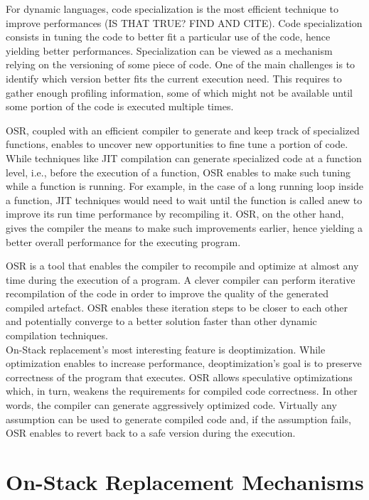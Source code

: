 For dynamic languages, code specialization is the most efficient technique to improve performances (IS THAT TRUE? FIND AND CITE).
Code specialization consists in tuning the code to better fit a particular use of the code, hence yielding better performances.
Specialization can be viewed as a mechanism relying on the versioning of some piece of code.
One of the main challenges is to identify which version better fits the current execution need.
This requires to gather enough profiling information, some of which might not be available until some portion of the code is executed multiple times.

OSR, coupled with an efficient compiler to generate and keep track of specialized functions, enables to uncover new opportunities to fine tune a portion of code.
While techniques like JIT compilation can generate specialized code at a function level, i.e., before the execution of a function, OSR enables to make such tuning while a function is running.
For example, in the case of a long running loop inside a function, JIT techniques would need to wait until the function is called anew to improve its run time performance by recompiling it. 
OSR, on the other hand, gives the compiler the means to make such improvements earlier, hence yielding a better overall performance for the executing program.

OSR is a tool that enables the compiler to recompile and optimize at almost any time during the execution of a program.
A clever compiler can perform iterative recompilation of the code in order to improve the quality of the generated compiled artefact.
OSR enables these iteration steps to be closer to each other and potentially converge to a better solution faster than other dynamic compilation techniques.\\

On-Stack replacement's most interesting feature is deoptimization. 
While optimization enables to increase performance, deoptimization's goal is to preserve correctness of the program that executes.
OSR allows speculative optimizations which, in turn, weakens the requirements for compiled code correctness. 
In other words, the compiler can generate aggressively optimized code. 
Virtually any assumption can be used to generate compiled code and, if the assumption fails, 
OSR enables to revert back to a safe version during the execution.\\

\section{On-Stack Replacement Mechanisms}

